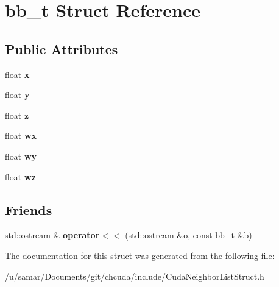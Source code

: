 \hypertarget{structbb__t}{}\section{bb\+\_\+t Struct Reference}
\label{structbb__t}
\subsection*{Public Attributes}
\begin{DoxyCompactItemize}
\item 
\hypertarget{structbb__t_ab85446de7f50f5e9477c8ebab41014d7}{}\label{structbb__t_ab85446de7f50f5e9477c8ebab41014d7} 
float {\bfseries x}
\item 
\hypertarget{structbb__t_ad2a01e06901d878813eb48aa8f7e24f1}{}\label{structbb__t_ad2a01e06901d878813eb48aa8f7e24f1} 
float {\bfseries y}
\item 
\hypertarget{structbb__t_a20558cd3ed9a7dc146725691c37718f4}{}\label{structbb__t_a20558cd3ed9a7dc146725691c37718f4} 
float {\bfseries z}
\item 
\hypertarget{structbb__t_a7ede093dd7e21a34842ac36f5548aa9b}{}\label{structbb__t_a7ede093dd7e21a34842ac36f5548aa9b} 
float {\bfseries wx}
\item 
\hypertarget{structbb__t_aad31d427ec9cb9e0ccb86c33091b00a4}{}\label{structbb__t_aad31d427ec9cb9e0ccb86c33091b00a4} 
float {\bfseries wy}
\item 
\hypertarget{structbb__t_aa22a64174602d10910ad05e99303cd1a}{}\label{structbb__t_aa22a64174602d10910ad05e99303cd1a} 
float {\bfseries wz}
\end{DoxyCompactItemize}
\subsection*{Friends}
\begin{DoxyCompactItemize}
\item 
\hypertarget{structbb__t_a03435536532f6dc82586d3ff5493f78b}{}\label{structbb__t_a03435536532f6dc82586d3ff5493f78b} 
std\+::ostream \& {\bfseries operator$<$$<$} (std\+::ostream \&o, const \hyperlink{structbb__t}{bb\+\_\+t} \&b)
\end{DoxyCompactItemize}


The documentation for this struct was generated from the following file\+:\begin{DoxyCompactItemize}
\item 
/u/samar/\+Documents/git/chcuda/include/Cuda\+Neighbor\+List\+Struct.\+h\end{DoxyCompactItemize}
